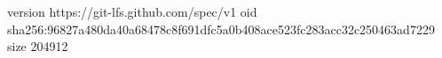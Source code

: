 version https://git-lfs.github.com/spec/v1
oid sha256:96827a480da40a68478c8f691dfc5a0b408ace523fc283acc32c250463ad7229
size 204912
